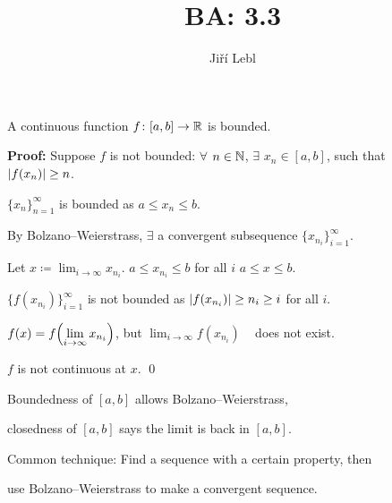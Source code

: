\documentclass[10pt,aspectratio=149]{beamer}
\author{Ji\v{r}\'i Lebl}
\institute[OSU]{%
Departemento pri Matematiko de Oklahoma {\^S}tata Universitato}
\title{BA: 3.3}
\date{}
\begin{document}
\begin{frame}
\titlepage
\end{frame}

\begin{frame}
\begin{lemma}
A continuous function $f \colon [a,b] \to {\mathbb{R}}$ is bounded.
\end{lemma}

\pause
\textbf{Proof:}
Suppose $f$ is not bounded:
$\forall$
$n \in {\mathbb{N}}$, $\exists$ $x_n \in [a,b]$, such that
~ $\left\lvert {f(x_n)} \right\rvert \geq n$.

\pause
\medskip

$\{ x_n \}_{n=1}^\infty$ is bounded as $a \leq x_n \leq b$.

\pause
\medskip

By Bolzano--Weierstrass,
$\exists$ a convergent subsequence $\{ x_{n_i} \}_{i=1}^\infty$.

\pause
\medskip

Let $\displaystyle x \coloneqq \lim_{i \to \infty} x_{n_i}$.  \quad
$a \leq x_{n_i} \leq b$ for all $i$ \wthus $a \leq x \leq b$.

\pause
\medskip

$\{ f(x_{n_i}) \}_{i=1}^\infty$ is not bounded 
as 
$\left\lvert {f(x_{n_i})} \right\rvert \geq n_i \geq i$ for all $i$.

\pause
\medskip

$\displaystyle f(x)
=
f\Bigl( \lim_{i\to\infty} x_{n_i} \Bigr)$,
\pause
\qquad but \qquad
$\displaystyle \lim_{i\to\infty} f(x_{n_i})$ ~ does not exist.

\pause
\medskip

\thus
\quad $f$ is not continuous at $x$.
\qed

\pause
\medskip

Boundedness of $[a,b]$ allows Bolzano--Weierstrass,

closedness of $[a,b]$ says the limit is back in $[a,b]$.

\pause
\medskip

Common technique: Find a sequence with a certain property, then

use Bolzano--Weierstrass to make a convergent sequence.

\end{frame}
\end{document}
